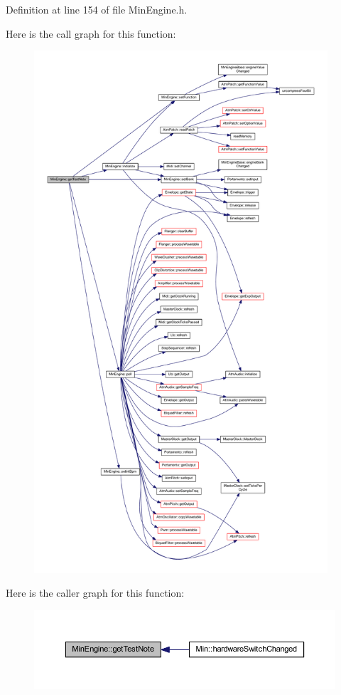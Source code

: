 Definition at line 154 of file Min\+Engine.\+h.

Here is the call graph for this function\+:
\nopagebreak
\begin{figure}[H]
\begin{center}
\leavevmode
\includegraphics[height=550pt]{d4/d0f/class_min_engine_a461861aff0eb8271558c9c20bc040b56_cgraph}
\end{center}
\end{figure}
Here is the caller graph for this function\+:
\nopagebreak
\begin{figure}[H]
\begin{center}
\leavevmode
\includegraphics[width=350pt]{d4/d0f/class_min_engine_a461861aff0eb8271558c9c20bc040b56_icgraph}
\end{center}
\end{figure}
\mbox{\label{class_min_engine_ae59276976966cfd710288c1bbf1ea0cf}} 
